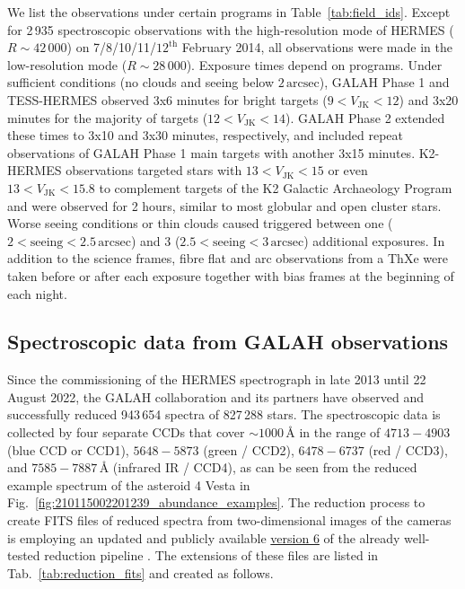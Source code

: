 \documentclass[
  journal=pasa,
  manuscript=research-paper, %
  year=2023,
  volume=37
]{cup-journal}
\begin{document}
We list the observations under certain programs in Table~\ref{tab:field_ids}. Except for 2\,935 spectroscopic observations with the high-resolution mode of HERMES ($R \sim 42\,000$) on 7/8/10/11/$12^\text{th}$ February 2014, all observations were made in the low-resolution mode ($R \sim 28\,000$). Exposure times depend on programs. Under sufficient conditions (no clouds and seeing below $2\,\mathrm{arcsec}$), GALAH Phase 1 and TESS-HERMES observed 3x6 minutes for bright targets ($9 < V_\mathrm{JK} < 12$) and 3x20 minutes for the majority of targets ($12 < V_\mathrm{JK} < 14$). GALAH Phase 2 extended these times to 3x10 and 3x30 minutes, respectively, and included repeat observations of GALAH Phase 1 main targets with another 3x15 minutes. K2-HERMES observations targeted stars with $13 < V_\mathrm{JK} < 15$ or even $13 < V_\mathrm{JK} < 15.8$ to complement targets of the K2 Galactic Archaeology Program \citep{Stello2015} and were observed for 2 hours, similar to most globular and open cluster stars. Worse seeing conditions or thin clouds caused triggered between one ($2 < \mathrm{seeing} < 2.5\,\mathrm{arcsec}$) and 3 ($2.5 < \mathrm{seeing} < 3\,\mathrm{arcsec}$) additional exposures. In addition to the science frames, fibre flat and arc observations from a ThXe were taken before or after each exposure together with bias frames at the beginning of each night.

\subsection{Spectroscopic data from GALAH observations}
\label{sec:spectroscopic_data_from_galah_observations}

Since the commissioning of the HERMES spectrograph in late 2013 until 22 August 2022, the GALAH collaboration and its partners have observed and successfully reduced 943\,654 spectra of 827\,288 stars. The spectroscopic data is collected by four separate CCDs that cover $\sim 1000\,\text{\AA}$ in the range of $4713-4903$ (blue CCD or CCD1), $5648-5873$ (green / CCD2), $6478-6737$ (red / CCD3), and $7585-7887\,\text{\AA}$ (infrared IR / CCD4), as can be seen from the reduced example spectrum of the asteroid 4 Vesta in Fig.~\ref{fig:210115002201239_abundance_examples}. The reduction process to create FITS files of reduced spectra from two-dimensional images of the cameras is employing an updated and publicly available \href{https://github.com/sheliak/galah_reduction/blob/master/extract6.0.py}{version 6} of the already well-tested reduction pipeline \citep{Kos2017}. The extensions of these files are listed in Tab.~\ref{tab:reduction_fits} and created as follows.
\end{document}
